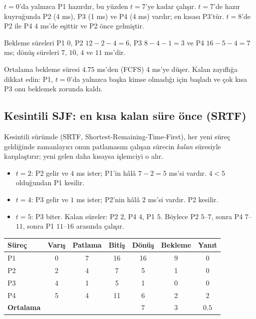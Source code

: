 $t=0$'da yalnızca P1 hazırdır, bu yüzden $t=7$'ye kadar çalışır. $t=7$'de hazır kuyruğunda P2 (4 ms), P3 (1 ms) ve P4 (4 ms) vardır; en kısası P3'tür. $t=8$'de P2 ile P4 $4$ ms'de eşittir ve P2 önce gelmiştir.

Bekleme süreleri P1 $0$, P2 $12-2-4=6$, P3 $8-4-1=3$ ve P4 $16-5-4=7$ ms; dönüş süreleri $7$, $10$, $4$ ve $11$ ms'dir.

Ortalama bekleme süresi $4.75$ ms'den (FCFS) $4$ ms'ye düşer. Kalan zayıflığa dikkat edin: P1, $t=0$'da yalnızca başka kimse olmadığı için başladı ve çok kısa P3 onu beklemek zorunda kaldı.

\subsection{Kesintili SJF: en kısa kalan süre önce (SRTF)}

Kesintili sürümde (SRTF, Shortest-Remaining-Time-First), her yeni süreç geldiğinde zamanlayıcı onun patlamasını çalışan sürecin \emph{kalan} süresiyle karşılaştırır; yeni gelen daha kısaysa işlemciyi o alır.

\begin{center}
\end{center}

\begin{itemize}
  \item $t=2$: P2 gelir ve $4$ ms ister; P1'in hâlâ $7-2=5$ ms'si vardır. $4<5$ olduğundan P1 kesilir.
  \item $t=4$: P3 gelir ve $1$ ms ister; P2'nin hâlâ $2$ ms'si vardır. P2 kesilir.
  \item $t=5$: P3 biter. Kalan süreler: P2 $2$, P4 $4$, P1 $5$. Böylece P2 $5$--$7$, sonra P4 $7$--$11$, sonra P1 $11$--$16$ arasında çalışır.
\end{itemize}

\begin{center}
\renewcommand{\arraystretch}{1.2}
\begin{tabular}{@{}lcccccc@{}}
\toprule
\textbf{Süreç} & \textbf{Varış} & \textbf{Patlama} & \textbf{Bitiş} & \textbf{Dönüş} & \textbf{Bekleme} & \textbf{Yanıt}\\
\midrule
P1 & 0 & 7 & 16 & 16 & 9 & 0\\
P2 & 2 & 4 & 7 & 5 & 1 & 0\\
P3 & 4 & 1 & 5 & 1 & 0 & 0\\
P4 & 5 & 4 & 11 & 6 & 2 & 2\\
\midrule
\textbf{Ortalama} & & & & $7$ & $3$ & $0.5$\\
\bottomrule
\end{tabular}
\end{center}

